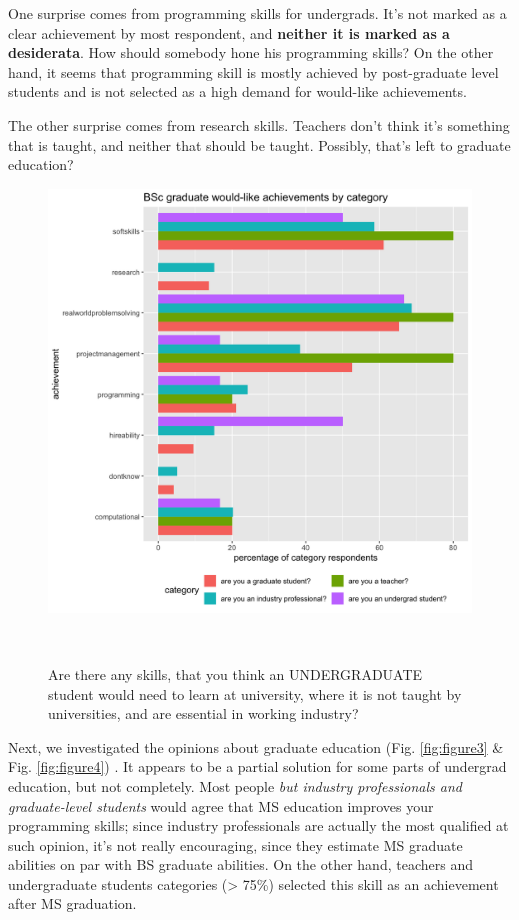 \documentclass{sigchi}
\begin{document}
One surprise comes from programming skills for undergrads. It's not marked as a clear achievement by most respondent, and \textbf{neither it is marked as a desiderata}. How should somebody hone his programming skills? On the other hand, it seems that programming skill is mostly achieved by post-graduate level students and is not selected as a high demand for would-like achievements. 

The other surprise comes from research skills. Teachers don't think it's something that is taught, and neither that should be taught. Possibly, that's left to graduate education?

\begin{figure}
 \includegraphics[scale=0.2]{../data-analysis/plots_output/BSc_graduate_would-like_achievements_by_category.png}
  \caption{Are there any skills, that you think an UNDERGRADUATE student would need to learn at university, where it is not taught by universities, and are essential in working industry?}~\label{fig:figure2}
\end{figure}

Next, we investigated the opinions about graduate education (Fig.  \ref{fig:figure3} \& Fig.  \ref{fig:figure4}) . It appears to be a partial solution for some parts of undergrad education, but not completely. Most people \textit{but industry professionals and graduate-level students} would agree that MS education improves your programming skills; since industry professionals are actually the most qualified at such opinion, it's not really encouraging, since they estimate MS graduate abilities on par with BS graduate abilities. On the other hand, teachers and undergraduate students categories (> 75\%) selected this skill as an achievement after MS graduation.
\end{document}
